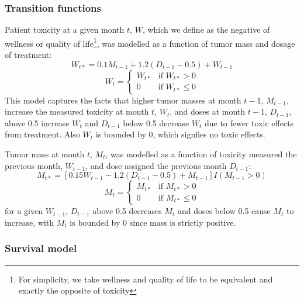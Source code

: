 \documentclass[12pt]{article}
\begin{document}
\subsubsection{Transition functions} %
\label{ssub:transition_functions}

Patient toxicity at a given month $t$, $W$, which we define as the negative of wellness or quality of life\footnote{For simplicity, we take wellness and quality of life to be equivalent and exactly the opposite of toxicity}, was modelled as a function of tumor mass and dosage of treatment:
%
\begin{equation}
W_{t*} = 0.1 M_{t-1} + 1.2 (D_{t-1} - 0.5) + W_{t - 1}
\end{equation}
\begin{equation}
W_{t} = \begin{cases}
  W_{t*} &\text{if } W_{t*} > 0 \\
  0 &\text{if } W_{t*} \leq 0
\end{cases}
\end{equation}
This model captures the facts that higher tumor masses at month $t-1$, $M_{t-1}$, increase the measured toxicity at month $t$, $W_{t}$, and doses at month $t-1$, $D_{t -1}$, above 0.5 increase $W_{t}$ and $D_{t -1}$ below 0.5 decrease $W_{t}$ due to fewer toxic effects from treatment. Also $W_{t}$ is bounded by 0, which signfies no toxic effects.

Tumor mass at month $t$, $M_{t}$, was modelled as a function of toxicity measured the previous month, $W_{t-1}$, and dose assigned the previous month $D_{t-1}$: 
%
\begin{equation}
M_{t*} = [0.15 W_{t-1} - 1.2 (D_{t-1} - 0.5) + M_{t - 1}] I(M_{t-1} > 0)
\end{equation}
\begin{equation}
M_{t} = \begin{cases}
  M_{t*} &\text{if } M_{t*} > 0 \\
  0 &\text{if } M_{t*} \leq 0
\end{cases}
\end{equation}
%
for a given $W_{t-1}$, $D_{t-1}$ above 0.5 decreases $M_{t}$ and doses below 0.5 cause $M_{t}$ to increase, with $M_{t}$ is bounded by 0 since mass is strictly positive.


\subsubsection{Survival model} %
\label{ssub:survival_model}
\end{document}
